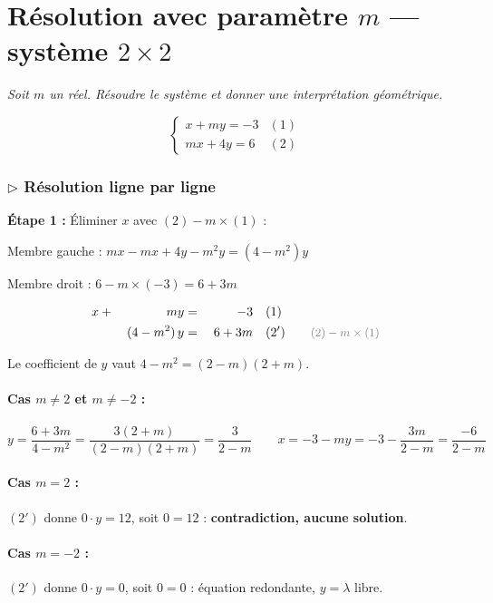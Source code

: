 \documentclass[12pt,a4paper]{article}
\newcommand{\ann}[1]{\qquad\textcolor{opcolor}{\text{\small #1}}}
\begin{document}
\section{Résolution avec paramètre $m$ --- système $2\times2$}

\textit{Soit $m$ un réel. Résoudre le système et donner une interprétation géométrique.}

\[
\begin{cases}
  x + my = -3 & (1)\\
  mx + 4y = 6 & (2)
\end{cases}
\]

\subsubsection*{$\triangleright$ Résolution ligne par ligne}

\textbf{Étape 1 :} Éliminer $x$ avec $(2) - m\times(1)$ :

Membre gauche : $mx - mx + 4y - m^2 y = (4-m^2)y$

Membre droit : $6 - m\times(-3) = 6+3m$

\begin{alignat*}{3}
  x &{}+{}&    my       &{}={}& -3     &\quad (1)\\
    &     & (4-m^2)\,y  &{}={}& 6+3m   &\quad (2') \ann{$(2) - m\times(1)$}
\end{alignat*}

Le coefficient de $y$ vaut $4-m^2 = (2-m)(2+m)$.

\paragraph{Cas $m \neq 2$ et $m \neq -2$ :}
\[
y = \frac{6+3m}{4-m^2} = \frac{3(2+m)}{(2-m)(2+m)} = \frac{3}{2-m}
\qquad
x = -3 - my = -3 - \frac{3m}{2-m} = \frac{-6}{2-m}
\]

\paragraph{Cas $m = 2$ :} $(2')$ donne $0\cdot y = 12$, soit $0=12$ : \textbf{contradiction, aucune solution}.

\paragraph{Cas $m = -2$ :} $(2')$ donne $0\cdot y = 0$, soit $0=0$ : équation redondante, $y = \lambda$ libre.
\end{document}
